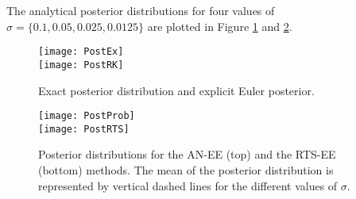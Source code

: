 \documentclass{siamart1116}
\numberwithin{theorem}{section}
\begin{document}
The analytical posterior distributions for four values of $\sigma = \{0.1, 0.05, 0.025, 0.0125\}$ are plotted in Figure \ref{fig:ExactRK} and \ref{fig:Prob}.
\begin{figure}
	\centering
	\texttt{[image: PostEx]} \\
	\texttt{[image: PostRK]}
	\caption{Exact posterior distribution and explicit Euler posterior.}
	\label{fig:ExactRK}
\end{figure}

\begin{figure}
	\centering
	\texttt{[image: PostProb]} \\
	\texttt{[image: PostRTS]}
	\caption{Posterior distributions for the AN-EE (top) and the RTS-EE (bottom) methods. The mean of the posterior distribution is represented by vertical dashed lines for the different values of $\sigma$.}
	\label{fig:Prob}
\end{figure}
\end{document}
